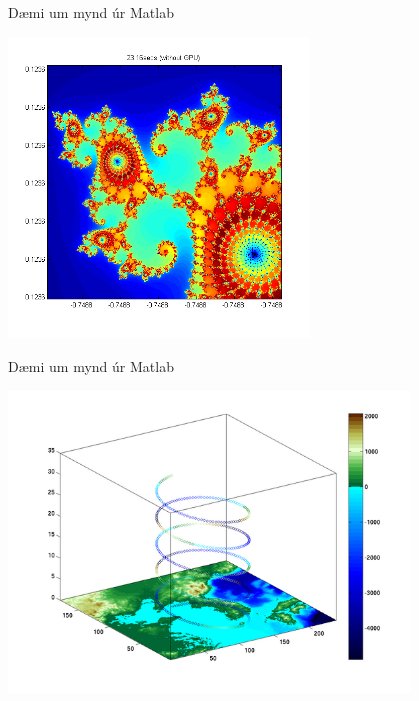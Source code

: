 \documentclass{beamer}
\begin{document}
\begin{frame}{Dæmi um mynd úr Matlab}
\begin{center}
\vspace{\baselineskip}
\includegraphics[width=0.6\textwidth]{Pics/plot-example3}
\end{center}
\end{frame}

\begin{frame}{Dæmi um mynd úr Matlab}
\begin{center}
\includegraphics[width=0.8\textwidth]{Pics/plot-example4}
\end{center}
\end{frame}
\end{document}
